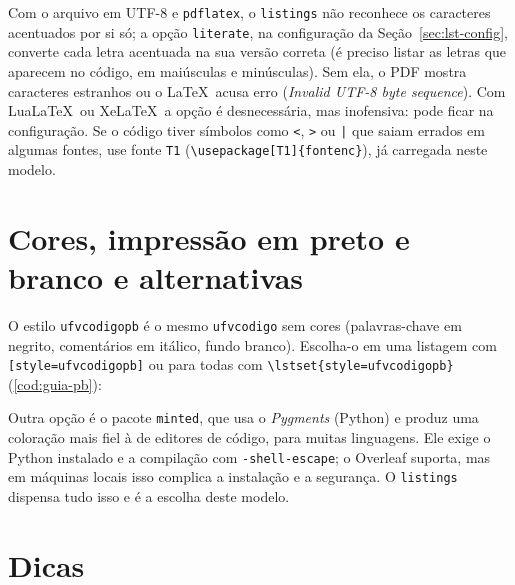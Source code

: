 Com o arquivo em UTF-8 e \texttt{pdflatex}, o \texttt{listings} não reconhece os
caracteres acentuados por si só; a opção \texttt{literate}, na configuração da
Seção~\ref{sec:lst-config}, converte cada letra acentuada na sua versão correta (é preciso listar as letras
que aparecem no código, em maiúsculas e minúsculas). Sem ela, o PDF mostra caracteres
estranhos ou o \LaTeX\ acusa erro (\emph{Invalid UTF-8 byte sequence}). Com Lua\LaTeX\ ou
Xe\LaTeX\ a opção é desnecessária, mas inofensiva: pode ficar na configuração. Se o código tiver símbolos como \texttt{<}, \texttt{>} ou
\texttt{|} que saiam errados em algumas fontes, use fonte \texttt{T1} (\texttt{\textbackslash usepackage[T1]\{fontenc\}}),
já carregada neste modelo.

\section{Cores, impressão em preto e branco e alternativas}\label{sec:cod-pb}

O estilo \texttt{ufvcodigopb} é o mesmo \texttt{ufvcodigo} sem cores (palavras-chave em
negrito, comentários em itálico, fundo branco). Escolha-o em uma listagem com
\texttt{[style=ufvcodigopb]} ou para todas com \texttt{\textbackslash lstset\{style=ufvcodigopb\}}
(\autoref{cod:guia-pb}):


Outra opção é o pacote \texttt{minted}, que usa o \emph{Pygments} (Python) e produz uma
coloração mais fiel à de editores de código, para muitas linguagens. Ele exige o Python
instalado e a compilação com \texttt{-shell-escape}; o Overleaf suporta, mas em máquinas
locais isso complica a instalação e a segurança. O \texttt{listings} dispensa tudo isso e é
a escolha deste modelo.

\section{Dicas}

